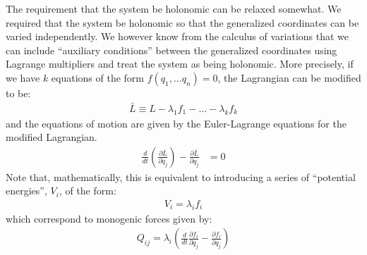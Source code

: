 The requirement that the system be holonomic can be relaxed somewhat. We required that the system be holonomic so that the generalized coordinates can be varied independently. We however know from the calculus of variations that we can include ``auxiliary conditions'' between the generalized coordinates using Lagrange multipliers and treat the system as being holonomic. More precisely, if we have $k$ equations of the form $f(q_1,\dots q_n)=0$, the Lagrangian can be modified to be:
\begin{align}
\bar{L}\equiv L-\lambda_1f_1-\dots -\lambda_kf_k
\end{align}
and the equations of motion are given by the Euler-Lagrange equations for the modified Lagrangian.
\begin{align}
\frac{d}{dt}\left(\frac{\partial \bar{L}}{\partial \dot{q}_j} \right) - \frac{\partial \bar{L}}{\partial q_j}&=0
\end{align}
Note that, mathematically, this is equivalent to introducing a series of ``potential energies'', $V_i$, of the form:
\begin{align}
V_i=\lambda_if_i
\end{align}
which correspond to monogenic forces given by:
\begin{align}
Q_{ij}=\lambda_i\left(\frac{d}{dt}\frac{\partial f_i}{\partial \dot{q}_j}-\frac{\partial f_i}{\partial q_j}\right)
\end{align}

